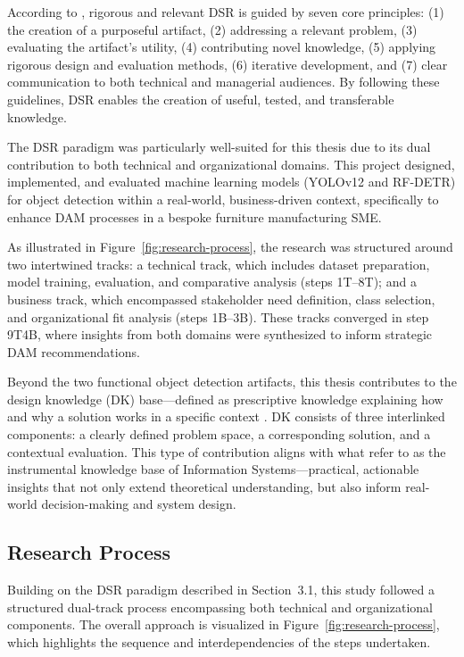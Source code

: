 \documentclass[a4paper,10pt,twocolumn]{article}
\numberwithin{figure}{section}
\numberwithin{table}{section}
\begin{document}
According to \citet{hevner2004design}, rigorous and relevant DSR is guided by seven core principles: 
(1) the creation of a purposeful artifact, (2) addressing a relevant problem, 
(3) evaluating the artifact’s utility, (4) contributing novel knowledge, 
(5) applying rigorous design and evaluation methods, (6) iterative development, 
and (7) clear communication to both technical and managerial audiences. 
By following these guidelines, DSR enables the creation of useful, tested, and transferable knowledge.

The DSR paradigm was particularly well-suited for this thesis due to its dual contribution 
to both technical and organizational domains. This project designed, implemented, 
and evaluated machine learning models (YOLOv12 and RF-DETR) for object detection 
within a real-world, business-driven context, specifically to enhance 
DAM processes in a bespoke furniture manufacturing SME.

As illustrated in Figure~\ref{fig:research-process}, the research was structured 
around two intertwined tracks: a technical track, which includes dataset preparation, 
model training, evaluation, and comparative analysis (steps 1T–8T); and a business track, 
which encompassed stakeholder need definition, class selection,
and organizational fit analysis (steps 1B–3B). These tracks converged in step 9T4B, 
where insights from both domains were synthesized to inform strategic DAM recommendations.

Beyond the two functional object detection artifacts, this thesis contributes 
to the design knowledge (DK) base—defined as prescriptive knowledge explaining 
how and why a solution works in a specific context \citep{vomBrocke2020introduction}. 
DK consists of three interlinked components: a clearly defined problem space, 
a corresponding solution, and a contextual evaluation.
This type of contribution aligns with what \citet{gregor2013positioning} 
refer to as the instrumental knowledge base of Information Systems—practical, 
actionable insights that not only extend theoretical understanding, 
but also inform real-world decision-making and system design.

\subsection{Research Process}

Building on the DSR paradigm described in Section~3.1, 
this study followed a structured dual-track process 
encompassing both technical and organizational components. 
The overall approach is visualized in Figure~\ref{fig:research-process}, 
which highlights the sequence and interdependencies of the steps undertaken.
\end{document}
